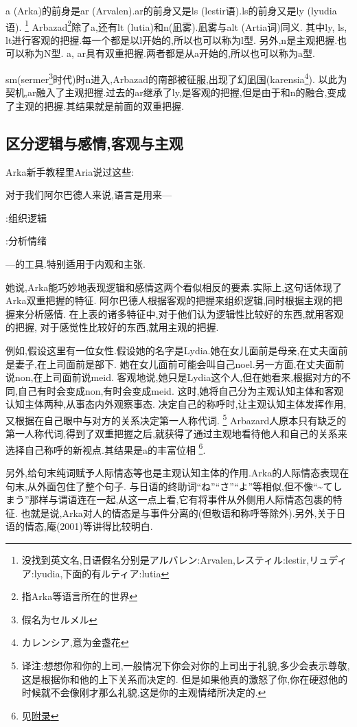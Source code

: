 a (Arka)的前身是ar (Arvalen).ar的前身又是ls (lestir语).ls的前身又是ly (lyudia语).
\footnote{没找到英文名,日语假名分别是アルバレン:Arvalen,レスティル:lestir,リュディア:lyudia,下面的有ルティア:lutia}
Arbazad\footnote{指Arka等语言所在的世界}除了a,还有lt (lutia)和n(凪雾).凪雾与alt (Artia词)同义.
其中ly, ls, lt进行客观的把握.每一个都是以l开始的,所以也可以称为l型.
另外,n是主观把握.也可以称为N型.
a, ar具有双重把握.两者都是从a开始的,所以也可以称为a型.

sm(sermer\footnote{假名为セルメル}时代)时n进入,Arbazad的南部被征服,出现了幻凪国(karensia\footnote{カレンシア,意为金盏花}).
以此为契机,ar融入了主观把握.过去的ar继承了ly,是客观的把握,但是由于和n的融合,变成了主观的把握.其结果就是前面的双重把握.

\subsection{区分逻辑与感情,客观与主观}

Arka新手教程里Aria说过这些:

{\kaishu 对于我们阿尔巴德人来说,语言是用来---

:组织逻辑

:分析情绪

---的工具.特别适用于内观和主张.}

她说,Arka能巧妙地表现逻辑和感情这两个看似相反的要素.实际上,这句话体现了Arka双重把握的特征.
阿尔巴德人根据客观的把握来组织逻辑,同时根据主观的把握来分析感情.
在上表的诸多特征中,对于他们认为逻辑性比较好的东西,就用客观的把握,
对于感觉性比较好的东西,就用主观的把握.

例如,假设这里有一位女性.假设她的名字是Lydia.她在女儿面前是母亲,在丈夫面前是妻子,在上司面前是部下.
她在女儿面前可能会叫自己noel.另一方面,在丈夫面前说non,在上司面前说meid.
客观地说,她只是Lydia这个人,但在她看来,根据对方的不同,自己有时会变成non,有时会变成meid.
这时,她将自己分为主观认知主体和客观认知主体两种,从事态内外观察事态.
决定自己的称呼时,让主观认知主体发挥作用,又根据在自己眼中与对方的关系决定第一人称代词.
\footnote{译注:想想你和你的上司,一般情况下你会对你的上司出于礼貌,多少会表示尊敬,这是根据你和他的上下关系而决定的.
但是如果他真的激怒了你,你在硬怼他的时候就不会像刚才那么礼貌,这是你的主观情绪所决定的.}
Arbazard人原本只有缺乏的第一人称代词,得到了双重把握之后,就获得了通过主观地看待他人和自己的关系来选择自己称呼的新视点.其结果是a的丰富位相
\footnote{见\hyperlink{appendix-pronouns}{附录}}.

另外,给句末纯词赋予人际情态等也是主观认知主体的作用.Arka的人际情态表现在句末,从外面包住了整个句子.
与日语的终助词``ね''``さ''``よ''等相似,但不像``\~{}てしまう''那样与谓语连在一起,从这一点上看,它有将事件从外侧用人际情态包裹的特征.
也就是说,Arka对人的情态是与事件分离的(但敬语和称呼等除外).另外,关于日语的情态,庵(2001)等讲得比较明白.

